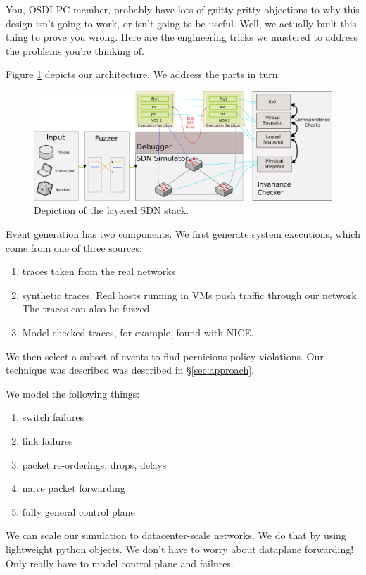 
You, OSDI PC member, probably have lots of gnitty gritty objections to why
this design isn't going to work, or isn't going to be useful. Well, we actually built this thing to prove
you wrong. Here are the engineering tricks we mustered to address the problems
you're thinking of.

Figure \ref{fig:system} depicts our architecture. We address the parts in turn:
\begin{figure}[t]
    \includegraphics[width=0.8\linewidth]{../diagrams/architecture/architecture.pdf}
    \caption[]{\label{fig:system} Depiction of the layered SDN stack.} 
\end{figure}

 Event generation has two components.
We first generate system executions, which come from one of three sources:
\begin{enumerate}
\item traces taken from the real networks
\item synthetic traces. Real hosts running in VMs push traffic through our
network. The traces can also be fuzzed. 
\item Model checked traces, for example, found with NICE.
\end{enumerate}

We then select a subset of events to find pernicious policy-violations. Our
technique was described was described in \S\ref{sec:approach}.

 We model the following things: 
\begin{enumerate}
\item switch failures
\item link failures
\item packet re-orderings, drops, delays
\item naive packet forwarding
\item fully general control plane
\end{enumerate}

We can scale our simulation to datacenter-scale networks. We do that by using lightweight python objects. We don't have to worry
about dataplane forwarding! Only really have to model control plane and failures.

